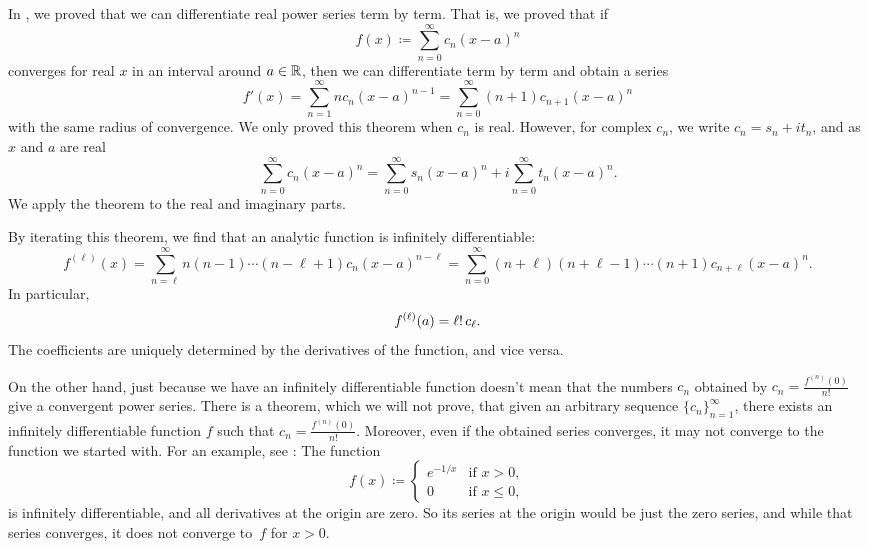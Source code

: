 In , we proved that we can
differentiate real power series term by term.  That is,
we proved that if
\begin{equation*}
f(x) \coloneqq \sum_{n=0}^\infty c_n {(x-a)}^n
\end{equation*}
converges for real $x$ in an interval around $a \in {\mathbb{R}}$, then we can differentiate
term by term and obtain a series
\begin{equation*}
f'(x) =
\sum_{n=1}^\infty n c_n {(x-a)}^{n-1}
=
\sum_{n=0}^\infty (n+1)c_{n+1} {(x-a)}^{n} 
\end{equation*}
with the same radius of convergence.
We only proved this theorem when $c_n$ is real.
However, for complex $c_n$,
we write
$c_n = s_n + i t_n$, and as $x$ and $a$ are real
\begin{equation*}
\sum_{n=0}^\infty c_n {(x-a)}^n
=
\sum_{n=0}^\infty s_n {(x-a)}^n
+
i
\sum_{n=0}^\infty t_n {(x-a)}^n .
\end{equation*}
We apply the theorem to the real and
imaginary parts.

By iterating this theorem, we find that an
analytic function is infinitely differentiable:
\begin{equation*}
f^{(\ell)}(x)
=
\sum_{n=\ell}^\infty n(n-1)\cdots(n-\ell+1)c_n {(x-a)}^{n-\ell}
=
\sum_{n=0}^\infty (n+\ell)(n+\ell-1)\cdots (n+1) c_{n+\ell} {(x-a)}^{n} .
\end{equation*}
In particular,
\begin{equation} \label{eq:formulaforpscoeffs}
f^{(\ell)}(a) = \ell! \, c_\ell .
\avoidbreak
\end{equation}
The coefficients are uniquely determined by the derivatives of the
function, and vice versa.

On the other hand, just because we have an infinitely differentiable
function doesn't mean that the numbers $c_n$ obtained by
$c_n = \frac{f^{(n)}(0)}{n!}$ give a convergent power series.
There is a theorem, which we will not prove,
that given an arbitrary sequence $\{ c_n \}_{n=1}^\infty$, there exists an
infinitely differentiable function $f$ such that
$c_n = \frac{f^{(n)}(0)}{n!}$.  Moreover, even if the obtained series
converges, it may not converge to the function we started with.
For an example,
see :  The
function
\begin{equation*}
f(x) \coloneqq
\begin{cases}
e^{-1/x} & \text{if } x > 0,\\
0        & \text{if } x \leq 0,
\end{cases}
\end{equation*}
is infinitely differentiable, and all derivatives at the origin are zero.
So
its series at the origin would be just the zero series, and while that
series converges, it does not converge to~$f$ for $x > 0$.

